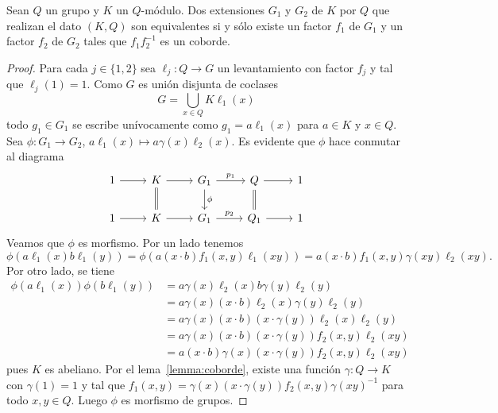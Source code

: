\begin{lemma}
	\label{lemma:equivalencia}
	Sean $Q$ un grupo y $K$ un $Q$-módulo. Dos extensiones $G_1$ y $G_2$ de $K$ por $Q$ 
	que realizan el dato $(K,Q)$ son
	equivalentes si y sólo existe un factor  $f_1$ de $G_1$ y un factor $f_2$
	de $G_2$ tales que $f_1f_2^{-1}$ es un coborde.
\end{lemma}

\begin{proof}
	Para cada $j\in\{1,2\}$ sea $\ell_j\colon Q\to G$ un levantamiento con
	factor $f_j$ y tal que $\ell_j(1)=1$. 
	Como $G$ es unión disjunta de coclases
	\[
	G=\bigcup_{x\in Q}K\ell_1(x)
	\]
	todo $g_1\in G_1$ se escribe unívocamente como $g_1=a\ell_1(x)$ para $a\in
	K$ y $x\in Q$. Sea $\phi\colon G_1\to G_2$, $a\ell_1(x)\mapsto
	a\gamma(x)\ell_2(x)$. Es evidente que $\phi$ hace conmutar al diagrama
	\begin{equation}
		\label{eq:diagrama}
\begin{tikzcd}
	1 & K & {G_1} & Q & 1 \\
	1 & K & {G_1} & {Q_1} & 1
	\arrow[from=1-2, to=1-3]
	\arrow["{p_1}", from=1-3, to=1-4]
	\arrow[from=1-4, to=1-5]
	\arrow[from=1-1, to=1-2]
	\arrow[from=2-1, to=2-2]
	\arrow[from=2-2, to=2-3]
	\arrow["{p_2}", from=2-3, to=2-4]
	\arrow[from=2-4, to=2-5]
	\arrow[equal, no head, from=1-2, to=2-2]
	\arrow["\phi", from=1-3, to=2-3]
	\arrow[equal, from=1-4, to=2-4]
    \end{tikzcd}
	\end{equation}
	Veamos que $\phi$ es morfismo. Por un lado tenemos
	\[
		\phi(a\ell_1(x)b\ell_1(y))=\phi(a(x\cdot b)f_1(x,y)\ell_1(xy))=a(x\cdot b)f_1(x,y)\gamma(xy)\ell_2(xy).
	\]
	Por otro lado, se tiene 
	\begin{align*}
		\phi(a\ell_1(x))\phi(b\ell_1(y))
		&=a\gamma(x)\ell_2(x)b\gamma(y)\ell_2(y)\\
		&=a\gamma(x)(x\cdot b)\ell_2(x)\gamma(y)\ell_2(y)\\
		&=a\gamma(x)(x\cdot b)(x\cdot \gamma(y))\ell_2(x)\ell_2(y)\\
		&=a\gamma(x)(x\cdot b)(x\cdot \gamma(y))f_2(x,y)\ell_2(xy)\\
		&=a(x\cdot b)\gamma(x)(x\cdot \gamma(y))f_2(x,y)\ell_2(xy)
	\end{align*}
	pues $K$ es abeliano.  Por el lema~\ref{lemma:coborde}, existe una función
	$\gamma\colon Q\to K$ con $\gamma(1)=1$ y tal que  
	$f_1(x,y)=\gamma(x)(x\cdot \gamma(y))f_2(x,y)\gamma(xy)^{-1}$ 
	para todo $x,y\in Q$. Luego $\phi$ es morfismo de grupos. 


\end{proof}
